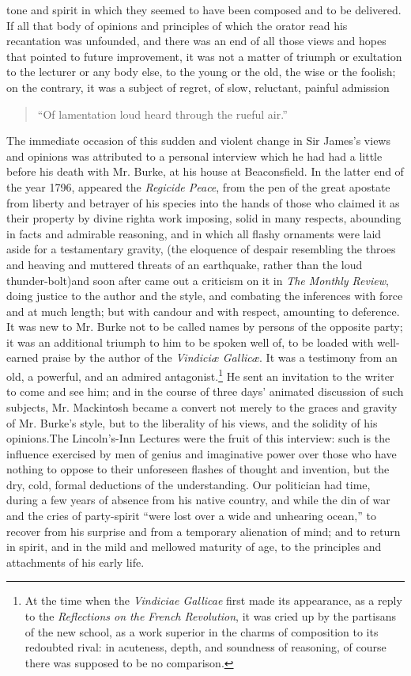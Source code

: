 tone and spirit in which they seemed to have been composed and to
be delivered. If all that body of opinions and principles of which
the orator read his recantation was unfounded, and there was an
end of all those views and hopes that pointed to future
improvement, it was not a matter of triumph or exultation to the
lecturer or any body else, to the young or the old, the wise or
the foolish; on the contrary, it was a subject of regret, of slow,
reluctant, painful admission\textemdash
\begin{quote} ``Of lamentation loud heard through the rueful
air.''
\end{quote} The immediate occasion of this sudden and violent
change in Sir James's views and opinions was attributed to a
personal interview which he had had a little before his death with
Mr. Burke, at his house at Beaconsfield. In the latter end of the
year 1796, appeared the \emph{Regicide Peace}, from the pen of the
great apostate from liberty and betrayer of his species into the
hands of those who claimed it as their property by divine
right\textemdash a work imposing, solid in many respects,
abounding in facts and admirable reasoning, and in which all
flashy ornaments were laid aside for a testamentary gravity, (the
eloquence of despair resembling the throes and heaving and
muttered threats of an earthquake, rather than the loud
thunder-bolt)\textemdash and soon after came out a criticism on it
in \emph{The Monthly Review}, doing justice to the author and the
style, and combating the inferences with force and at much length;
but with candour and with respect, amounting to deference. It was
new to Mr.  Burke not to be called names by persons of the
opposite party; it was an additional triumph to him to be spoken
well of, to be loaded with well-earned praise by the author of the
\emph{Vindiciæ Gallicæ}. It was a testimony from an old, a
powerful, and an admired antagonist.\footnote{At the time when the
\emph{Vindiciae Gallicae} first made its appearance, as a reply to
the \emph{Reflections on the French Revolution}, it was cried up
by the partisans of the new school, as a work superior in the
charms of composition to its redoubted rival: in acuteness, depth,
and soundness of reasoning, of course there was supposed to be no
comparison.} He sent an invitation to the writer to come and see
him; and in the course of three days' animated discussion of such
subjects, Mr. Mackintosh became a convert not merely to the graces
and gravity of Mr. Burke's style, but to the liberality of his
views, and the solidity of his opinions.\textemdash The
Lincoln's-Inn Lectures were the fruit of this interview: such is
the influence exercised by men of genius and imaginative power
over those who have nothing to oppose to their unforeseen flashes
of thought and invention, but the dry, cold, formal deductions of
the understanding.  Our politician had time, during a few years of
absence from his native country, and while the din of war and the
cries of party-spirit ``were lost over a wide and unhearing
ocean,'' to recover from his surprise and from a temporary
alienation of mind; and to return in spirit, and in the mild and
mellowed maturity of age, to the principles and attachments of his
early life.

